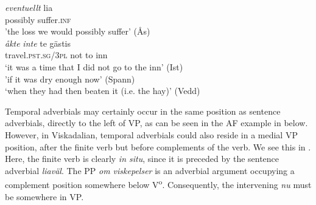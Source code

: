 \documentclass[output=paper,colorlinks,citecolor=brown,draft,draftmode]{langscibook}
\begin{document}
\ea\label{ex:petzell:17}
\gll     \textit{{eventuellt}}    lia   \\
    possibly      suffer.\textsc{inf}  \\
\glt    ’the loss we would possibly suffer’ (Ås)  \\

\gll     \textit{{åkte}} \textit{{inte}}    te  gästis      \\
    travel.\textsc{pst.sg}/3\textsc{pl}  not    to  inn   \\
\glt `it was a time that I did not go to the inn’ (Ist)  \\

\glt    ’if it was dry enough now’ (Spann)  \\
\glt `when they had then beaten it (i.e. the hay)’ (Vedd)
\z
\z


Temporal adverbials may certainly occur in the same position as sentence adverbials, directly to the left of VP, as can be seen in the AF example in  below. However, in Viskadalian, temporal adverbials could also reside in a medial VP position, after the finite verb but before complements of the verb. We see this in . Here, the finite verb is clearly \textit{in situ}, since it is preceded by the sentence adverbial \textit{liaväl}. The PP \textit{om viskepelser} is an adverbial argument occupying a complement position somewhere below V\textsuperscript{o}. Consequently, the intervening \textit{nu} must be somewhere in VP.
\end{document}
